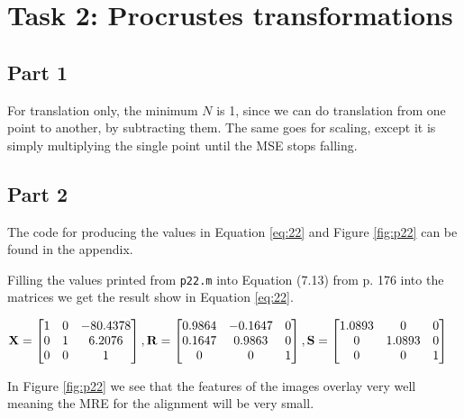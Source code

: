 \section{Task 2: Procrustes transformations}

\subsection{Part 1}




For translation only, the minimum $N$ is 1, since we can do translation from one point to another, by subtracting them.
The same goes for scaling, except it is simply multiplying the single point until the MSE stops falling.


\subsection{Part 2}

The code for producing the values in Equation \ref{eq:22} and Figure
\ref{fig:p22} can be found in the appendix.

Filling the values printed from \texttt{p22.m} into Equation (7.13) from p. 176
into the matrices we get the result show in Equation \ref{eq:22}.

\begin{align}
  \text{\textbf{X}} &= \begin{bmatrix}
    1 & 0 & -80.4378 \\
    0 & 1 & 6.2076   \\
    0 & 0 & 1
  \end{bmatrix},
  \text{\textbf{R}} = \begin{bmatrix}
    0.9864 & -0.1647 & 0 \\
    0.1647 & 0.9863  & 0 \\
    0 & 0 & 1
  \end{bmatrix},
  \text{\textbf{S}} = \begin{bmatrix}
    1.0893 & 0 & 0 \\
    0 & 1.0893 & 0 \\
    0 & 0 & 1
  \end{bmatrix}
  \label{eq:22}
\end{align}


  In Figure \ref{fig:p22} we see that the features of the images overlay very well meaning the
  MRE for the alignment will be very small.